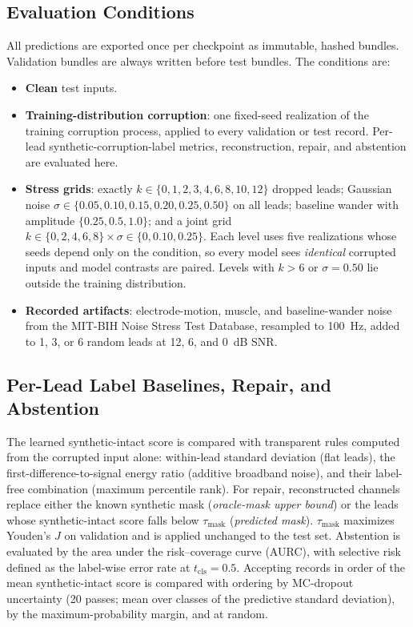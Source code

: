 \subsection{Evaluation Conditions}
\label{subsec:eval_conditions}
All predictions are exported once per checkpoint as immutable, hashed bundles. Validation bundles are always written before test bundles. The conditions are:
\begin{itemize}
    \item \textbf{Clean} test inputs.
    \item \textbf{Training-distribution corruption}: one fixed-seed realization of the training corruption process, applied to every validation or test record. Per-lead synthetic-corruption-label metrics, reconstruction, repair, and abstention are evaluated here.
    \item \textbf{Stress grids}: exactly $k\in\{0,1,2,3,4,6,8,10,12\}$ dropped leads; Gaussian noise $\sigma\in\{0.05,0.10,0.15,0.20,0.25,0.50\}$ on all leads; baseline wander with amplitude $\{0.25,0.5,1.0\}$; and a joint grid $k\in\{0,2,4,6,8\}\times\sigma\in\{0,0.10,0.25\}$. Each level uses five realizations whose seeds depend only on the condition, so every model sees \emph{identical} corrupted inputs and model contrasts are paired. Levels with $k>6$ or $\sigma=0.50$ lie outside the training distribution.
    \item \textbf{Recorded artifacts}: electrode-motion, muscle, and baseline-wander noise from the MIT-BIH Noise Stress Test Database, resampled to 100~Hz, added to 1, 3, or 6 random leads at 12, 6, and 0~dB SNR.
\end{itemize}

\subsection{Per-Lead Label Baselines, Repair, and Abstention}
The learned synthetic-intact score is compared with transparent rules computed from the corrupted input alone: within-lead standard deviation (flat leads), the first-difference-to-signal energy ratio (additive broadband noise), and their label-free combination (maximum percentile rank). For repair, reconstructed channels replace either the known synthetic mask (\emph{oracle-mask upper bound}) or the leads whose synthetic-intact score falls below $\tau_{\text{mask}}$ (\emph{predicted mask}). $\tau_{\text{mask}}$ maximizes Youden's $J$ on validation and is applied unchanged to the test set. Abstention is evaluated by the area under the risk--coverage curve (AURC), with selective risk defined as the label-wise error rate at $t_{\text{cls}}=0.5$. Accepting records in order of the mean synthetic-intact score is compared with ordering by MC-dropout uncertainty (20 passes; mean over classes of the predictive standard deviation), by the maximum-probability margin, and at random.


